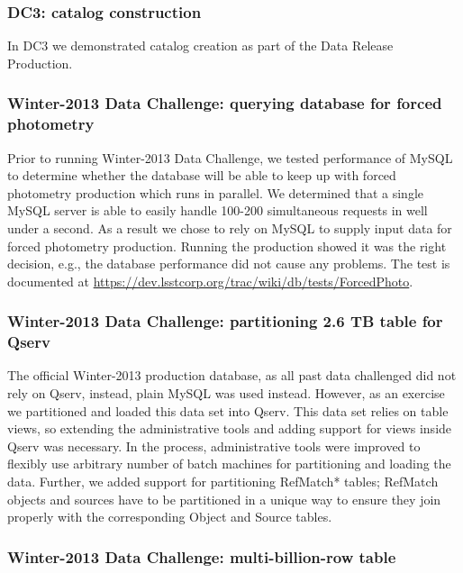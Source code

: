 \documentclass[DM,lsstdraft,toc]{lsstdoc}
\begin{document}
\subsubsection{DC3: catalog
construction}\label{dc3-catalog-construction}

In DC3 we demonstrated catalog creation as part of the Data Release
Production.

\subsubsection{Winter-2013 Data Challenge: querying database for forced
photometry}\label{winter-2013-data-challenge-querying-database-for-forced-photometry}

Prior to running Winter-2013 Data Challenge, we tested performance of
MySQL to determine whether the database will be able to keep up with
forced photometry production which runs in parallel. We determined that
a single MySQL server is able to easily handle 100-200 simultaneous
requests in well under a second. As a result we chose to rely on MySQL
to supply input data for forced photometry production. Running the
production showed it was the right decision, e.g., the database
performance did not cause any problems. The test is documented at
\url{https://dev.lsstcorp.org/trac/wiki/db/tests/ForcedPhoto}.

\subsubsection{Winter-2013 Data Challenge: partitioning 2.6 TB table for
Qserv}\label{winter-2013-data-challenge-partitioning-2.6-tb-table-for-qserv}

The official Winter-2013 production database, as all past data
challenged did not rely on Qserv, instead, plain MySQL was used instead.
However, as an exercise we partitioned and loaded this data set into
Qserv. This data set relies on table views, so extending the
administrative tools and adding support for views inside Qserv was
necessary. In the process, administrative tools were improved to
flexibly use arbitrary number of batch machines for partitioning and
loading the data. Further, we added support for partitioning RefMatch*
tables; RefMatch objects and sources have to be partitioned in a unique
way to ensure they join properly with the corresponding Object and
Source tables.

\subsubsection{Winter-2013 Data Challenge: multi-billion-row
table}\label{winter-2013-data-challenge-multi-billion-row-table}
\end{document}
